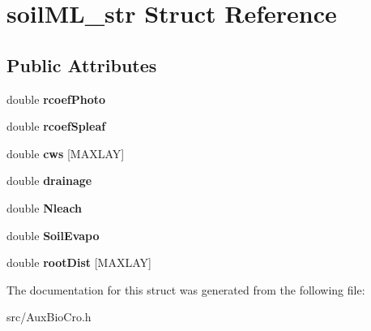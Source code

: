 \hypertarget{structsoil_m_l__str}{\section{soil\-M\-L\-\_\-str Struct Reference}
\label{structsoil_m_l__str}
}
\subsection*{Public Attributes}
\begin{DoxyCompactItemize}
\item 
\hypertarget{structsoil_m_l__str_a18a83a9cab2ee1fe35ec98a9a3a7a7c8}{double {\bfseries rcoef\-Photo}}\label{structsoil_m_l__str_a18a83a9cab2ee1fe35ec98a9a3a7a7c8}

\item 
\hypertarget{structsoil_m_l__str_a61a206aa7c24239e09e3d717368665a5}{double {\bfseries rcoef\-Spleaf}}\label{structsoil_m_l__str_a61a206aa7c24239e09e3d717368665a5}

\item 
\hypertarget{structsoil_m_l__str_a7f3063e129dc6591454f7b5050eb3d6c}{double {\bfseries cws} \mbox{[}M\-A\-X\-L\-A\-Y\mbox{]}}\label{structsoil_m_l__str_a7f3063e129dc6591454f7b5050eb3d6c}

\item 
\hypertarget{structsoil_m_l__str_aa4ad1174e804109cf6b5c675c37b3f8c}{double {\bfseries drainage}}\label{structsoil_m_l__str_aa4ad1174e804109cf6b5c675c37b3f8c}

\item 
\hypertarget{structsoil_m_l__str_a01cde156faa3f11579218b3759f5f126}{double {\bfseries Nleach}}\label{structsoil_m_l__str_a01cde156faa3f11579218b3759f5f126}

\item 
\hypertarget{structsoil_m_l__str_ad1c34d3fec2b0784367f785d57906217}{double {\bfseries Soil\-Evapo}}\label{structsoil_m_l__str_ad1c34d3fec2b0784367f785d57906217}

\item 
\hypertarget{structsoil_m_l__str_a4ff288d6741c98f41855d489942ab1af}{double {\bfseries root\-Dist} \mbox{[}M\-A\-X\-L\-A\-Y\mbox{]}}\label{structsoil_m_l__str_a4ff288d6741c98f41855d489942ab1af}

\end{DoxyCompactItemize}


The documentation for this struct was generated from the following file\-:\begin{DoxyCompactItemize}
\item 
src/Aux\-Bio\-Cro.\-h\end{DoxyCompactItemize}
